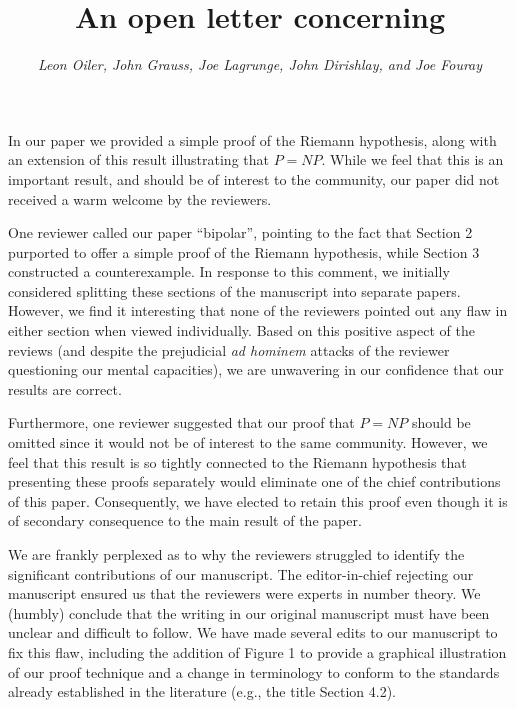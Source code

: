 \documentclass[11pt]{article}
\begin{document}
\title{\bf An open letter concerning \\
\vspace{5mm}{\em   A Simple Proof of the Riemann Hypothesis}}
\author{\large\em  Leon Oiler, John Grauss, Joe Lagrunge, John Dirishlay, and Joe Fouray }

\date{} %

\maketitle
\pagestyle{empty}

In our paper we provided a simple proof of the Riemann hypothesis,
along with an extension of this result illustrating that $P = NP$.
While we feel that this is an important result, and should be of
interest to the community, our paper did not received a warm welcome
by the reviewers.

One reviewer called our paper ``bipolar'', pointing to the fact that
Section 2 purported to offer a simple proof of the Riemann hypothesis,
while Section 3 constructed a counterexample.  In response to this
comment, we initially considered splitting these sections of the
manuscript into separate papers. However, we find it interesting that
none of the reviewers pointed out any flaw in either section when
viewed individually.  Based on this positive aspect of the reviews
(and despite the prejudicial \emph{ad hominem} attacks of the
reviewer questioning our mental capacities), we are unwavering in our
confidence that our results are correct.

Furthermore, one reviewer suggested that our proof that $P = NP$
should be omitted since it would not be of interest to the same
community.  However, we feel that this result is so tightly
connected to the Riemann hypothesis that presenting these proofs
separately would eliminate one of the chief contributions of this
paper. Consequently, we have elected to retain this proof even
though it is of secondary consequence to the main result of the
paper.

We are frankly perplexed as to why the reviewers struggled to identify
the significant contributions of our manuscript.  The editor-in-chief
rejecting our manuscript ensured us that the reviewers were experts in
number theory.  We (humbly) conclude that the writing in our original
manuscript must have been unclear and difficult to follow.  We have
made several edits to our manuscript to fix this flaw, including the
addition of Figure 1 to provide a graphical illustration of our proof
technique and a change in terminology to conform to the standards
already established in the literature (e.g., the title Section 4.2).
\end{document}
